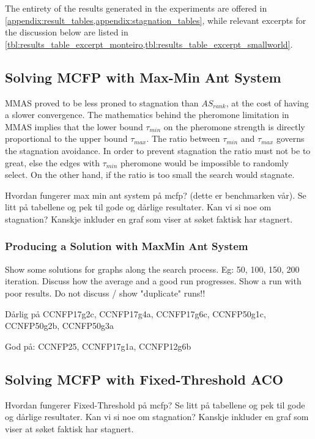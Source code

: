 The entirety of the results generated in the experiments are offered in \cref{appendix:result_tables,appendix:stagnation_tables}, while relevant excerpts for the discussion below are listed in \cref{tbl:results_table_excerpt_monteiro,tbl:results_table_excerpt_smallworld}.




% 


\subsection{Solving MCFP with Max-Min Ant System}
MMAS proved to be less proned to stagnation than $AS_{rank}$, at the cost of having a slower convergence. The mathematics behind the pheromone limitation in MMAS implies that the lower bound $\tau_{min}$ on the pheromone strength is directly proportional to the upper bound $\tau_{max}$. The ratio between $\tau_{min}$ and $\tau_{max}$ governs the stagnation avoidance. In order to prevent stagnation the ratio must not be to great, else the edges with $\tau_{min}$ pheromone would be impossible to randomly select. On the other hand, if the ratio is too small the search would stagnate. 



Hvordan fungerer max min ant system på mcfp? (dette er benchmarken vår). Se litt på tabellene og pek til gode og dårlige resultater. Kan vi si noe om stagnation? Kanskje inkluder en graf som viser at søket faktisk har stagnert.

\subsubsection{Producing a Solution with MaxMin Ant System}
Show some solutions for graphs along the search process. Eg: 50, 100, 150, 200 iteration. Discuss how the average and a good run progresses. Show a run with poor results. Do not discuss / show "duplicate" runs!! 

Dårlig på CCNFP17g2c, CCNFP17g4a, CCNFP17g6c, CCNFP50g1c, CCNFP50g2b, CCNFP50g3a

God på: CCNFP25, CCNFP17g1a, CCNFP12g6b

% 


\subsection{Solving MCFP with Fixed-Threshold ACO}
Hvordan fungerer Fixed-Threshold på mcfp? Se litt på tabellene og pek til gode og dårlige resultater. Kan vi si noe om stagnation? Kanskje inkluder en graf som viser at søket faktisk har stagnert.

